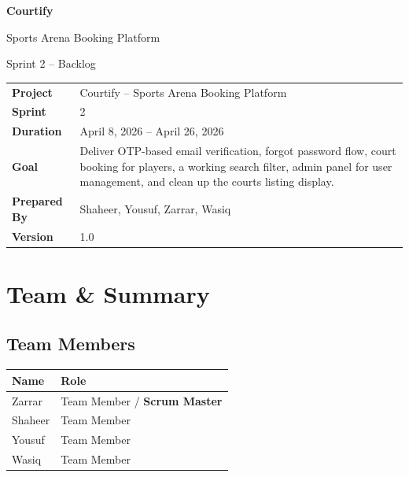 \documentclass[12pt,a4paper]{article}
\begin{document}

\begin{titlepage}
\centering
\vspace*{2cm}
{\Huge\bfseries\color{sectionblue} Courtify}\par
\vspace{0.4cm}
{\Large Sports Arena Booking Platform}\par
\vspace{1.5cm}
{\huge Sprint 2 -- Backlog}\par
\vspace{2cm}
\renewcommand{\arraystretch}{1.5}
\begin{tabular}{>{\bfseries}l p{10cm}}
Project     & Courtify -- Sports Arena Booking Platform \\
Sprint      & 2 \\
Duration    & April 8, 2026 -- April 26, 2026 \\
Goal        & Deliver OTP-based email verification, forgot password flow, court booking for players, a working search filter, admin panel for user management, and clean up the courts listing display. \\
Prepared By & Shaheer, Yousuf, Zarrar, Wasiq \\
Version     & 1.0 \\
\end{tabular}
\end{titlepage}

\newpage

\section{Team \& Summary}

\subsection*{Team Members}
\renewcommand{\arraystretch}{1.4}
\begin{tabularx}{\textwidth}{|X|X|}
\hline
\rowcolor{headerbg}\color{white}\bfseries Name & \color{white}\bfseries Role \\ \hline
Zarrar & Team Member / \textbf{Scrum Master} \\ \hline
\rowcolor{rowgray}Shaheer & Team Member \\ \hline
Yousuf & Team Member \\ \hline
\rowcolor{rowgray}Wasiq & Team Member \\ \hline
\end{tabularx}
\end{document}
